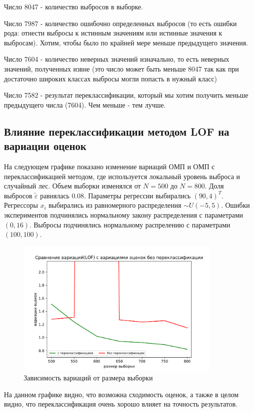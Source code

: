 Число 8047 - количество выбросов в выборке.

Число 7987 - количество ошибочно определенных выбросов (то есть ошибки рода: отнести выбросы к истинным значениям или истинные значения к выбросам). Хотим, чтобы было по крайней мере меньше предыдущего значения.

Число 7604 - количество неверных значений изначально, то есть неверных значений, полученных извне (это число может быть меньше 8047 так как при достаточно широких классах выбросы могли попасть в нужный класс)

Число 7582 - результат переклассификации, который мы хотим получить меньше предыдущего числа (7604). Чем меньше - тем лучше.


\subsection{Влияние переклассификации методом LOF на вариации оценок}
На следующем графике показано изменение вариаций ОМП и ОМП с переклассификацией методом, где используется локальный уровень выброса и случайный лес.
Объем выборки изменялся от $N=500$ до $N=800$. 
Доля выбросов $\widetilde{\varepsilon}$ равнялась $0.08$. 
Параметры регрессии выбирались $(90, 4)^T$. 
Регрессоры $x_i$ выбирались из равномерного распределения $\sim U(-5,5)$. 
Ошибки экспериментов подчинялись нормальному закону распределения с параметрами $(0, 16)$. Выбросы подчинялись нормальному распрелению с параметрами $(100, 100)$. 

\begin{figure}[hb]
    \centering
    \includegraphics[width=100mm]{../images/LOF_without(0).pdf}
    \caption{Зависимость вариаций от размера выборки\label{overflow}}
\end{figure}

На данном графике видно, что возможна сходимость оценок, а также в целом видно, что переклассификация очень хорошо влияет на точность результатов.

\newpage

\newpage
